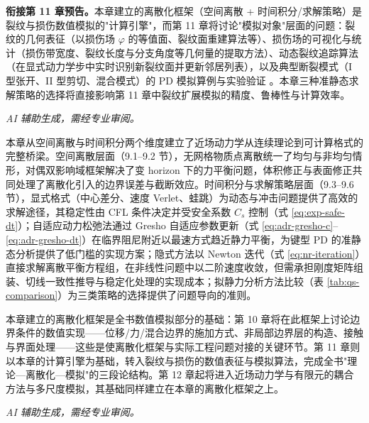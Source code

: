 \textbf{衔接第 11 章预告。}本章建立的离散化框架（空间离散 + 时间积分/求解策略）是裂纹与损伤数值模拟的"计算引擎"，而第 11 章将讨论"模拟对象"层面的问题：裂纹的几何表征（以损伤场 $\varphi$ 的等值面、裂纹面重建算法等）、损伤场的可视化与统计（损伤带宽度、裂纹长度与分支角度等几何量的提取方法）、动态裂纹追踪算法（在显式动力学步中实时识别新裂纹面并更新邻居列表），以及典型断裂模式（I 型张开、II 型剪切、混合模式）的 PD 模拟算例与实验验证 \cite{HaBobaru2010,Diehl2019,ZhangHeng2022}。本章三种准静态求解策略的选择将直接影响第 11 章中裂纹扩展模拟的精度、鲁棒性与计算效率。

\emph{AI 辅助生成，需经专业审阅。}

本章从空间离散与时间积分两个维度建立了近场动力学从连续理论到可计算格式的完整桥梁。空间离散层面（9.1--9.2 节），无网格物质点离散统一了均匀与非均匀情形，对偶双影响域框架解决了变 horizon 下的力平衡问题，体积修正与表面修正共同处理了离散化引入的边界误差与截断效应。时间积分与求解策略层面（9.3--9.6 节），显式格式（中心差分、速度 Verlet、蛙跳）为动态与冲击问题提供了高效的求解途径，其稳定性由 CFL 条件决定并受安全系数 $C_s$ 控制（式 \eqref{eq:exp-safe-dt}）；自适应动力松弛法通过 Gresho 自适应参数更新（式 \eqref{eq:adr-gresho-c}--\eqref{eq:adr-gresho-dt}）在临界阻尼附近以最速方式趋近静力平衡，为键型 PD 的准静态分析提供了低门槛的实现方案；隐式方法以 Newton 迭代（式 \eqref{eq:nr-iteration}）直接求解离散平衡方程组，在非线性问题中以二阶速度收敛，但需承担刚度矩阵组装、切线一致性推导与稳定化处理的实现成本；拟静力分析方法比较（表 \ref{tab:qs-comparison}）为三类策略的选择提供了问题导向的准则。

本章建立的离散化框架是全书数值模拟部分的基础：第 10 章将在此框架上讨论边界条件的数值实现——位移/力/混合边界的施加方式、非局部边界层的构造、接触与界面处理——这些是使离散化框架与实际工程问题对接的关键环节。第 11 章则以本章的计算引擎为基础，转入裂纹与损伤的数值表征与模拟算法，完成全书"理论—离散化—模拟"的三段论结构。第 12 章起将进入近场动力学与有限元的耦合方法与多尺度模拟，其基础同样建立在本章的离散化框架之上。

\emph{AI 辅助生成，需经专业审阅。}

